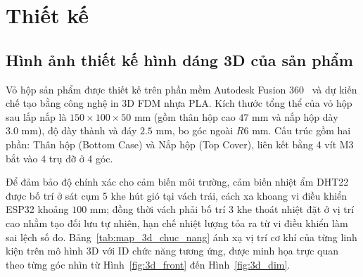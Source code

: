 \section{Thiết kế}

\subsection{Hình ảnh thiết kế hình dáng 3D của sản phẩm}

Vỏ hộp sản phẩm được thiết kế trên phần mềm Autodesk Fusion 360~\cite{fusion360} và dự kiến chế tạo bằng công nghệ in 3D FDM nhựa PLA. Kích thước tổng thể của vỏ hộp sau lắp nắp là $150 \times 100 \times 50\text{ mm}$ (gồm thân hộp cao $47\text{ mm}$ và nắp hộp dày $3.0\text{ mm}$), độ dày thành và đáy $2.5\text{ mm}$, bo góc ngoài $R6\text{ mm}$. Cấu trúc gồm hai phần: Thân hộp (Bottom Case) và Nắp hộp (Top Cover), liên kết bằng 4 vít M3 bắt vào 4 trụ đỡ ở 4 góc.

Để đảm bảo độ chính xác cho cảm biến môi trường, cảm biến nhiệt ẩm DHT22 được bố trí ở sát cụm 5 khe hút gió tại vách trái, cách xa khoang vi điều khiển ESP32 khoảng $100\text{ mm}$; đồng thời vách phải bố trí 3 khe thoát nhiệt đặt ở vị trí cao nhằm tạo đối lưu tự nhiên, hạn chế nhiệt lượng tỏa ra từ vi điều khiển làm sai lệch số đo. Bảng~\ref{tab:map_3d_chuc_nang} ánh xạ vị trí cơ khí của từng linh kiện trên mô hình 3D với ID chức năng tương ứng, được minh họa trực quan theo từng góc nhìn từ Hình~\ref{fig:3d_front} đến Hình~\ref{fig:3d_dim}.

